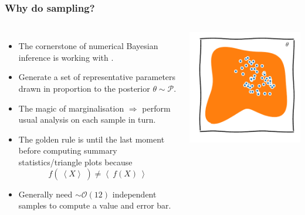 \documentclass[aspectratio=169, handout]{beamer}
\newcommand{\av}[2][]{\left\langle #2\right\rangle_{#1}}
\begin{document}
\begin{frame}
    \frametitle{Why do sampling?}
    \begin{columns}
        \begin{itemize}
            \item The cornerstone of numerical Bayesian inference is working with .
            \item Generate a set of representative parameters drawn in proportion to the posterior $\theta\sim\mathcal{P}$.
            \item The magic of marginalisation $\Rightarrow$ perform usual analysis on each sample in turn.
            \item The golden rule is  until the last moment before computing summary statistics/triangle plots because \[\boxed{f(\:\av{X}\:)\ne \av{\:f(X)\:}}\]
            \item Generally need $\sim\mathcal{O}(12)$ independent samples to compute a value and error bar.
        \end{itemize}
        \includegraphics{figures/samples.pdf}
    \end{columns}
\end{frame}
\end{document}
